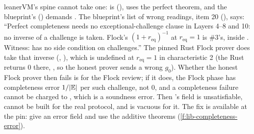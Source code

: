 leanerVM's spine cannot take one: \allowbreak{}\allowbreak{} is 
(),  uses the perfect theorem, and the
blueprint's  (\allowbreak{}\allowbreak{}) demands
\allowbreak{}. The blueprint's list of wrong
readings, item 20 (), says: \enquote{Perfect completeness needs no
exceptional-challenge clause in Layers 4--8 and 10: no inverse of a challenge is taken. Flock's
$(1 + r_{\mathrm{eq}})^{-1}$ at $r_{\mathrm{eq}} = 1$ is \#3's, inside . Witness:
 has no side condition on challenges.} The pinned Rust Flock prover
does take that inverse (\allowbreak{}\allowbreak{}\allowbreak{},
), which is undefined at
$r_{\mathrm{eq}} = 1$ in characteristic 2 (the Rust  returns $0$ there,
\allowbreak{}\allowbreak{}\allowbreak{}\allowbreak{}, so the honest prover sends a wrong
$g_0$). Whether the honest Flock prover then fails is for the Flock review; if it does, the Flock
phase has completeness error $1/\lvert \mathbb{E}\rvert$ per such challenge, not $0$, and a completeness failure
cannot be charged to , which is a soundness error. Then 's
 field is unsatisfiable,  cannot be built for the
real protocol, and  is vacuous for it. The fix is available at the
pin: give  an error field and use the additive theorems
(\cref{f:lib-completeness-error}).

\par\endgroup